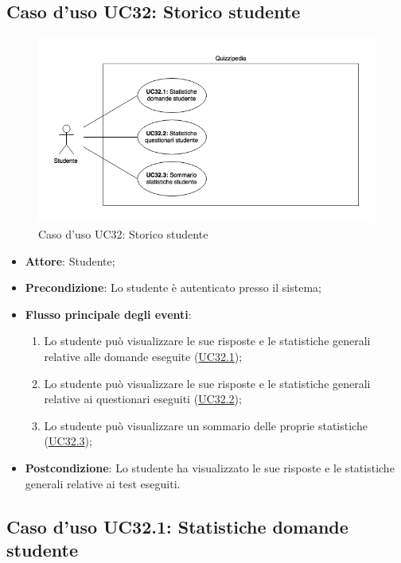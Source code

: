 \documentclass[12pt,a4paper]{article}
\begin{document}
\subsection{Caso d'uso UC32: Storico studente}
\begin{figure}[H]
	\centering
	\includegraphics[width=\textwidth]{diagramUC32.png}
	\caption{Caso d'uso UC32: Storico studente}\label{fig:UC32} 
\end{figure}
\begin{itemize}

\item \textbf{Attore}: Studente; 
\item \textbf{Precondizione}: Lo studente è autenticato presso il sistema;

\item \textbf{Flusso principale degli eventi}:
\begin{enumerate}
	\item Lo studente può visualizzare le sue risposte e le statistiche generali relative alle domande eseguite (\hyperlink{UC32.1}{UC32.1});
	\item Lo studente può visualizzare le sue risposte e le statistiche generali relative ai questionari eseguiti (\hyperlink{UC32.2}{UC32.2});
	\item Lo studente può visualizzare un sommario delle proprie statistiche (\hyperlink{UC32.3}{UC32.3});
	
\end{enumerate}
\item \textbf{Postcondizione}: Lo studente ha visualizzato le sue risposte e le statistiche generali relative ai test eseguiti.
\end{itemize}
\hypertarget{UC32.1}{}
\subsection{Caso d'uso UC32.1: Statistiche domande studente}
\end{document}
